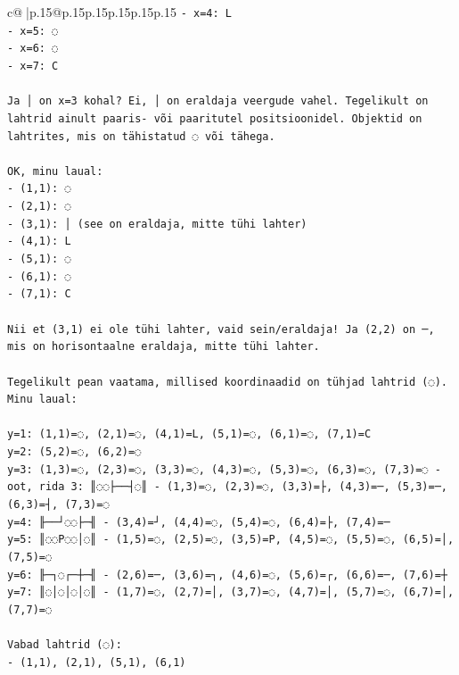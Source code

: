 \documentclass{article}
\begin{document}
{\begin{supertabular}{c@{$\;$}|p{.15\linewidth}@{}p{.15\linewidth}p{.15\linewidth}p{.15\linewidth}p{.15\linewidth}p{.15\linewidth}}
{{{\texttt{{-} x=4: L} \\
\texttt{{-} x=5: ◌} \\
\texttt{{-} x=6: ◌} \\
\texttt{{-} x=7: C} \\
\\ 
\texttt{Ja │ on x=3 kohal? Ei, │ on eraldaja veergude vahel. Tegelikult on lahtrid ainult paaris{-} või paaritutel positsioonidel. Objektid on lahtrites, mis on tähistatud ◌ või tähega.} \\
\\ 
\texttt{OK, minu laual:} \\
\texttt{{-} (1,1): ◌} \\
\texttt{{-} (2,1): ◌} \\
\texttt{{-} (3,1): │ (see on eraldaja, mitte tühi lahter)} \\
\texttt{{-} (4,1): L} \\
\texttt{{-} (5,1): ◌} \\
\texttt{{-} (6,1): ◌} \\
\texttt{{-} (7,1): C} \\
\\ 
\texttt{Nii et (3,1) ei ole tühi lahter, vaid sein/eraldaja! Ja (2,2) on ─, mis on horisontaalne eraldaja, mitte tühi lahter.} \\
\\ 
\texttt{Tegelikult pean vaatama, millised koordinaadid on tühjad lahtrid (◌). Minu laual:} \\
\\ 
\texttt{y=1: (1,1)=◌, (2,1)=◌, (4,1)=L, (5,1)=◌, (6,1)=◌, (7,1)=C} \\
\texttt{y=2: (5,2)=◌, (6,2)=◌} \\
\texttt{y=3: (1,3)=◌, (2,3)=◌, (3,3)=◌, (4,3)=◌, (5,3)=◌, (6,3)=◌, (7,3)=◌ {-} oot, rida 3: ║◌◌├──┤◌║ {-} (1,3)=◌, (2,3)=◌, (3,3)=├, (4,3)=─, (5,3)=─, (6,3)=┤, (7,3)=◌} \\
\texttt{y=4: ╟──┘◌◌├─╢ {-} (3,4)=┘, (4,4)=◌, (5,4)=◌, (6,4)=├, (7,4)=─} \\
\texttt{y=5: ║◌◌P◌◌│◌║ {-} (1,5)=◌, (2,5)=◌, (3,5)=P, (4,5)=◌, (5,5)=◌, (6,5)=│, (7,5)=◌} \\
\texttt{y=6: ╟─┐◌┌─┼─╢ {-} (2,6)=─, (3,6)=┐, (4,6)=◌, (5,6)=┌, (6,6)=─, (7,6)=┼} \\
\texttt{y=7: ║◌│◌│◌│◌║ {-} (1,7)=◌, (2,7)=│, (3,7)=◌, (4,7)=│, (5,7)=◌, (6,7)=│, (7,7)=◌} \\
\\ 
\texttt{Vabad lahtrid (◌):} \\
\texttt{{-} (1,1), (2,1), (5,1), (6,1)} \\
}}}
\end{supertabular}}
\end{document}
